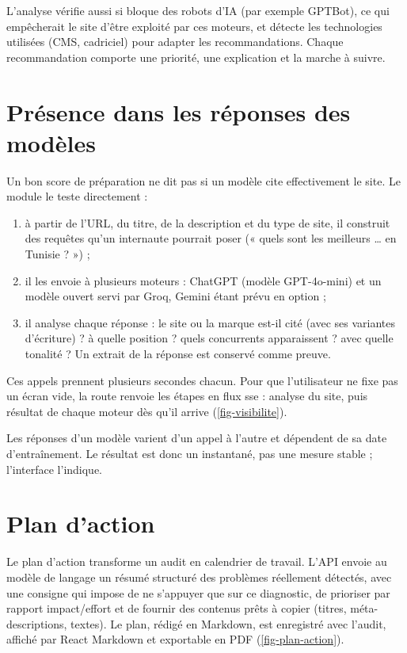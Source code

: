 L'analyse vérifie aussi si  bloque des robots d'IA (par exemple GPTBot), ce qui empêcherait le site d'être exploité par ces moteurs, et détecte les technologies utilisées (CMS, cadriciel) pour adapter les recommandations. Chaque recommandation comporte une priorité, une explication et la marche à suivre. 

\section{Présence dans les réponses des modèles}
Un bon score de préparation ne dit pas si un modèle cite effectivement le site. Le module  le teste directement :
\begin{enumerate}
  \item à partir de l'URL, du titre, de la description et du type de site, il construit des requêtes qu'un internaute pourrait poser (« quels sont les meilleurs \ldots{} en Tunisie ? ») ;
  \item il les envoie à plusieurs moteurs : ChatGPT (modèle GPT-4o-mini) et un modèle ouvert servi par Groq, Gemini étant prévu en option ;
  \item il analyse chaque réponse : le site ou la marque est-il cité (avec ses variantes d'écriture) ? à quelle position ? quels concurrents apparaissent ? avec quelle tonalité ? Un extrait de la réponse est conservé comme preuve.
\end{enumerate}

Ces appels prennent plusieurs secondes chacun. Pour que l'utilisateur ne fixe pas un écran vide, la route  renvoie les étapes en flux \gls{sse} \cite{whatwgsse} : analyse du site, puis résultat de chaque moteur dès qu'il arrive (\cref{fig-visibilite}).


Les réponses d'un modèle varient d'un appel à l'autre et dépendent de sa date d'entraînement. Le résultat est donc un instantané, pas une mesure stable ; l'interface l'indique. 

\section{Plan d'action}
Le plan d'action transforme un audit en calendrier de travail. L'API envoie au modèle de langage un résumé structuré des problèmes réellement détectés, avec une consigne qui impose de ne s'appuyer que sur ce diagnostic, de prioriser par rapport impact/effort et de fournir des contenus prêts à copier (titres, méta-descriptions, textes). Le plan, rédigé en Markdown, est enregistré avec l'audit, affiché par React Markdown et exportable en PDF (\cref{fig-plan-action}).


